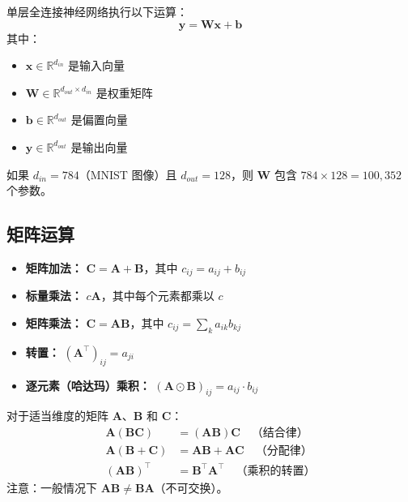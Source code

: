 \begin{示例}[神经网络层作为矩阵运算]
单层全连接神经网络执行以下运算：
\begin{equation}
\mathbf{y} = \mathbf{W}\mathbf{x} + \mathbf{b}
\end{equation}
其中：
\begin{itemize}
    \item $\mathbf{x} \in \mathbb{R}^{d_{in}}$ 是输入向量
    \item $\mathbf{W} \in \mathbb{R}^{d_{out} \times d_{in}}$ 是权重矩阵
    \item $\mathbf{b} \in \mathbb{R}^{d_{out}}$ 是偏置向量
    \item $\mathbf{y} \in \mathbb{R}^{d_{out}}$ 是输出向量
\end{itemize}
如果 $d_{in} = 784$（MNIST 图像）且 $d_{out} = 128$，则 $\mathbf{W}$ 包含 $784 \times 128 = 100,352$ 个参数。
\end{示例}

\subsection{矩阵运算}

\begin{itemize}
    \item \textbf{矩阵加法：} $\mathbf{C} = \mathbf{A} + \mathbf{B}$，其中 $c_{ij} = a_{ij} + b_{ij}$
    \item \textbf{标量乘法：} $c\mathbf{A}$，其中每个元素都乘以 $c$
    \item \textbf{矩阵乘法：} $\mathbf{C} = \mathbf{AB}$，其中 $c_{ij} = \sum_{k} a_{ik}b_{kj}$
    \item \textbf{转置：} $(\mathbf{A}^\top)_{ij} = a_{ji}$
    \item \textbf{逐元素（哈达玛）乘积：} $(\mathbf{A} \odot \mathbf{B})_{ij} = a_{ij} \cdot b_{ij}$
\end{itemize}

\begin{性质}[矩阵乘法性质]
对于适当维度的矩阵 $\mathbf{A}$、$\mathbf{B}$ 和 $\mathbf{C}$：
\begin{align}
\mathbf{A}(\mathbf{BC}) &= (\mathbf{AB})\mathbf{C} \quad \text{（结合律）} \\
\mathbf{A}(\mathbf{B} + \mathbf{C}) &= \mathbf{AB} + \mathbf{AC} \quad \text{（分配律）} \\
(\mathbf{AB})^\top &= \mathbf{B}^\top \mathbf{A}^\top \quad \text{（乘积的转置）}
\end{align}
注意：一般情况下 $\mathbf{AB} \neq \mathbf{BA}$（不可交换）。
\end{性质}

